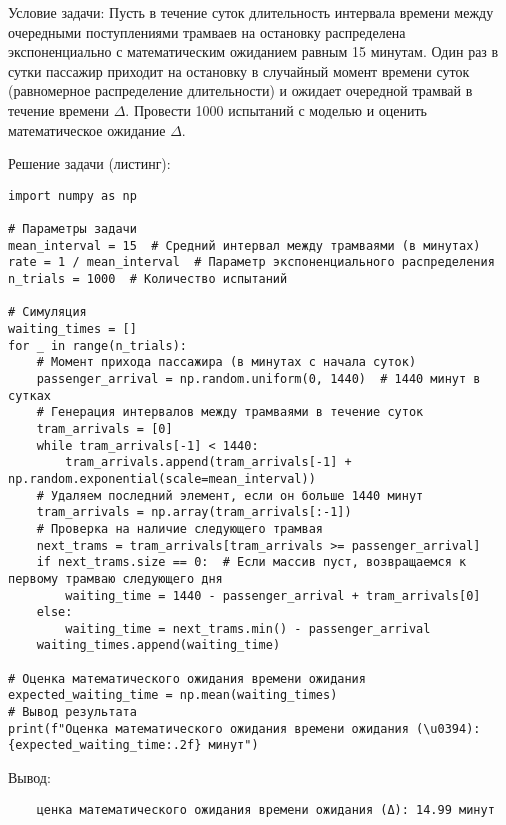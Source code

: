 Условие задачи: Пусть в течение суток длительность интервала времени между очередными поступлениями трамваев на остановку распределена экспоненциально с математическим ожиданием равным 15 минутам. Один раз в сутки пассажир приходит на остановку в случайный момент времени суток (равномерное распределение длительности) и ожидает очередной трамвай в течение времени $\Delta$. Провести 1000 испытаний с моделью и оценить математическое ожидание $\Delta$.

Решение задачи (листинг):

\begin{verbatim}
import numpy as np

# Параметры задачи
mean_interval = 15  # Средний интервал между трамваями (в минутах)
rate = 1 / mean_interval  # Параметр экспоненциального распределения
n_trials = 1000  # Количество испытаний

# Симуляция
waiting_times = []
for _ in range(n_trials):
    # Момент прихода пассажира (в минутах с начала суток)
    passenger_arrival = np.random.uniform(0, 1440)  # 1440 минут в сутках
    # Генерация интервалов между трамваями в течение суток
    tram_arrivals = [0]
    while tram_arrivals[-1] < 1440:
        tram_arrivals.append(tram_arrivals[-1] + np.random.exponential(scale=mean_interval))
    # Удаляем последний элемент, если он больше 1440 минут
    tram_arrivals = np.array(tram_arrivals[:-1])
    # Проверка на наличие следующего трамвая
    next_trams = tram_arrivals[tram_arrivals >= passenger_arrival]
    if next_trams.size == 0:  # Если массив пуст, возвращаемся к первому трамваю следующего дня
        waiting_time = 1440 - passenger_arrival + tram_arrivals[0]
    else:
        waiting_time = next_trams.min() - passenger_arrival
    waiting_times.append(waiting_time)

# Оценка математического ожидания времени ожидания
expected_waiting_time = np.mean(waiting_times)
# Вывод результата
print(f"Оценка математического ожидания времени ожидания (\u0394): {expected_waiting_time:.2f} минут")
\end{verbatim}

Вывод:
\begin{verbatim}
    ценка математического ожидания времени ожидания (Δ): 14.99 минут
\end{verbatim}